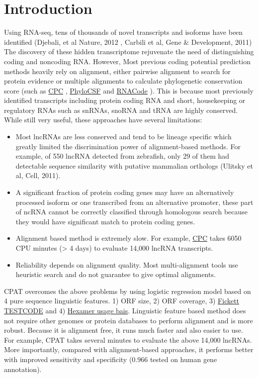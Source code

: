 \documentclass[letterpaper,10pt,english]{sphinxmanual}
\begin{document}
\chapter{Introduction}
\label{index:introduction}\label{index:release-history}
Using RNA-seq, tens of thousands of novel transcripts and isoforms have been identified (Djebali, et al  Nature, 2012
, Carbili et al, Gene \& Development, 2011)
The discovery of these hidden transcriptome rejuvenate the need of distinguishing coding
and noncoding RNA. However, Most previous coding potential prediction methods heavily rely
on alignment, either pairwise alignment to search for protein evidence or multiple alignments
to calculate phylogenetic conservation score (such as \href{http://cpc.cbi.pku.edu.cn/}{CPC} , \href{http://compbio.mit.edu/PhyloCSF}{PhyloCSF} and \href{http://wash.github.com/rnacode/}{RNACode} ). This is because most previously identified transcripts
including protein coding RNA and short, housekeeping or regulatory RNAs such as snRNAs,
snoRNA and tRNA are highly conserved. While still very useful, these approaches have several
limitations:
\begin{itemize}
\item {} 
Most lncRNAs are less conserved and tend to be lineage specific which greatly limited the discrimination power of alignment-based methods. For example, of 550 lncRNA detected from zebrafish, only 29 of them had detectable sequence similarity with putative mammalian orthologs (Ulitsky  et al, Cell, 2011).

\item {} 
A significant fraction of protein coding genes may have an alternatively processed isoform or one transcribed from an alternative promoter, these part of ncRNA cannot be correctly classified through homologous search because they would have significant match to protein coding genes.

\item {} 
Alignment based method is extremely slow. For example, \href{http://www.ncbi.nlm.nih.gov/pubmed/17631615}{CPC} takes 6050 CPU minutes (\textgreater{} 4 days) to evaluate 14,000 lncRNA transcripts.

\item {} 
Reliability depends on alignment quality. Most multi-alignment tools use heuristic search and do not guarantee to give optimal alignments.

\end{itemize}

CPAT overcomes the above problems by using logistic regression model based on 4 pure sequence
linguistic features. 1) ORF size, 2) ORF coverage,
3) \href{http://nar.oxfordjournals.org/content/10/17/5303.abstract}{Fickett TESTCODE} and 4)
\href{http://nar.oxfordjournals.org/content/20/24/6441.abstract}{Hexamer usage bais}. Linguistic
feature based method does not require other genomes or protein databases to perform alignment
and is more robust. Because it is alignment free, it runs much faster and also easier to use.
For example,  CPAT takes several minutes to evaluate the above 14,000 lncRNAs. More importantly,
compared with alignment-based approaches, it performs better with improved sensitivity and
specificity (0.966 tested on human gene annotation).
\end{document}
